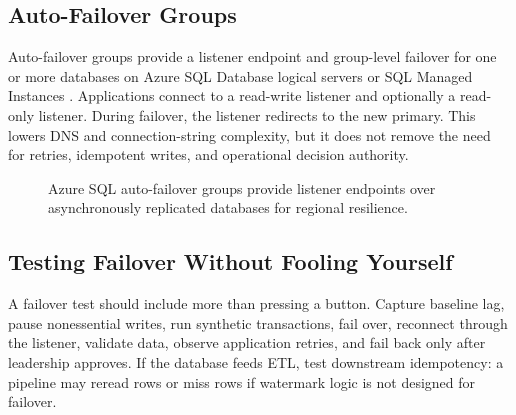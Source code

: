 \subsection{Auto-Failover Groups}
Auto-failover groups provide a listener endpoint and group-level failover for one or more databases on Azure SQL Database logical servers or SQL Managed Instances \cite{microsoft2025failoverGroups}. Applications connect to a read-write listener and optionally a read-only listener. During failover, the listener redirects to the new primary. This lowers DNS and connection-string complexity, but it does not remove the need for retries, idempotent writes, and operational decision authority.

\begin{figure}[H]
    \centering
    \caption{Azure SQL auto-failover groups provide listener endpoints over asynchronously replicated databases for regional resilience.}
    \label{fig:auto-failover-group}
\end{figure}

\subsection{Testing Failover Without Fooling Yourself}
A failover test should include more than pressing a button. Capture baseline lag, pause nonessential writes, run synthetic transactions, fail over, reconnect through the listener, validate data, observe application retries, and fail back only after leadership approves. If the database feeds ETL, test downstream idempotency: a pipeline may reread rows or miss rows if watermark logic is not designed for failover.

